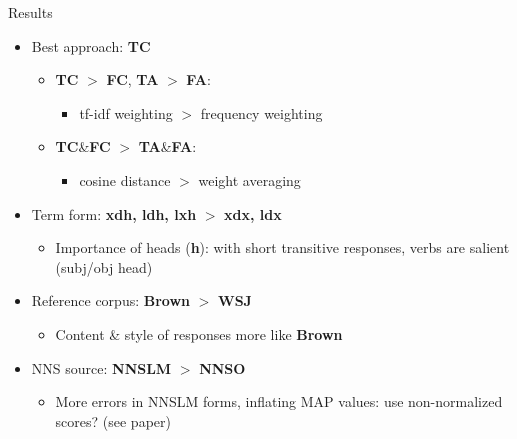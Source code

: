 \documentclass[final,t]{beamer}
\begin{document}
\begin{frame}{}
\begin{columns}[t]
\begin{column}{.64\linewidth}
\begin{columns}
\begin{column}{.49\linewidth}
\begin{block}{Results}
\vspace{.6em}
\begin{multicols}{2}
\begin{itemize}
	\item{Best approach: \textbf{TC}}
	\begin{itemize}
		\item{\textbf{TC} $>$ \textbf{FC}, \textbf{TA} $>$ \textbf{FA}:} 
		\begin{itemize}
			\item{tf-idf weighting $>$ frequency weighting}
		\end{itemize}
		\item{\textbf{TC}\&\textbf{FC} $>$ \textbf{TA}\&\textbf{FA}:}
		\begin{itemize}
			\item{cosine distance $>$ weight averaging}
		\end{itemize}
	\end{itemize}
	\item{Term form: \textbf{xdh, ldh, lxh} $>$ \textbf{xdx, ldx}}
	\begin{itemize}
        \item{Importance of heads (\textbf{h}): with short transitive
            responses, verbs are salient (subj/obj head)}
	\end{itemize}
	\item{Reference corpus: \textbf{Brown} $>$ \textbf{WSJ}}
	\begin{itemize}
        \item{Content \& style of responses more like \textbf{Brown}}
	\end{itemize}
	\item{NNS source: \textbf{NNSLM} $>$ \textbf{NNSO}}
	\begin{itemize}
        \item{More errors in NNSLM forms, inflating MAP values:
            use non-normalized scores? (see paper)}
	\end{itemize}
\end{itemize}


\end{multicols}
\end{block}
\end{column}
\end{columns}
\end{column}
\end{columns}
\end{frame}
\end{document}
